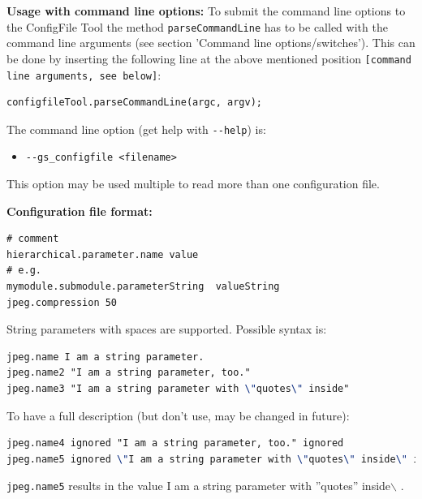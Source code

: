 {\bf Usage with command line options:} To submit the command line options to the ConfigFile Tool the method \lstinline|parseCommandLine| has to be called with the command line arguments (see section 'Command line options/switches'). This can be done by inserting the following line at the above mentioned position \lstinline|[command line arguments, see below]|:

\begin{lstlisting}
configfileTool.parseCommandLine(argc, argv);
\end{lstlisting}

The command line option (get help with \lstinline|--help|) is:
\begin{itemize}
	\item \lstinline|--gs_configfile <filename>| %
\end{itemize}

This option may be used multiple to read more than one configuration file.

\noindent
\begin{minipage}{\textwidth}
{\bf Configuration file format:}
\begin{lstlisting}[language=TeX]
# comment
hierarchical.parameter.name value
# e.g.
mymodule.submodule.parameterString  valueString
jpeg.compression 50
\end{lstlisting}
\end{minipage}

\noindent
\begin{minipage}{\textwidth}
String parameters with spaces are supported. Possible syntax is:
\begin{lstlisting}[language=TeX]
jpeg.name I am a string parameter.
jpeg.name2 "I am a string parameter, too."
jpeg.name3 "I am a string parameter with \"quotes\" inside"
\end{lstlisting}
\end{minipage}

\noindent
\begin{minipage}{\textwidth}
To have a full description (but don't use, may be changed in future):
\begin{lstlisting}[language=TeX]
jpeg.name4 ignored "I am a string parameter, too." ignored
jpeg.name5 ignored \"I am a string parameter with \"quotes\" inside\" ignored
\end{lstlisting}
\vspace{-.5em}
\lstinline|jpeg.name5| results in the value {\sffamily \colorbox{hellgrau}{ I am a string parameter with ''quotes'' inside$\backslash$ }}.
\end{minipage}

